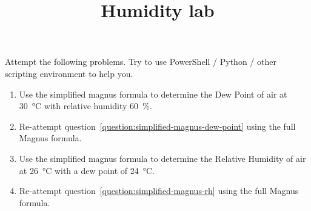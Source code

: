 \documentclass{pgnotes}
\title{Humidity lab}
\begin{document}
\maketitle

Attempt the following problems.
Try to use PowerShell / Python / other scripting environment to help you. 

\begin{enumerate}

  
\item
  \label{question:simplified-magnus-dew-point}
  Use the simplified magnus formula to determine the Dew Point of air at \SI{30}{\celsius} with relative humidity \SI{60}{\percent}.

\item
  Re-attempt question~\ref{question:simplified-magnus-dew-point} using the full Magnus formula.
  
\item
  \label{question:simplified-magnus-rh}  
  Use the simplified magnus formula to determine the Relative Humidity of air at \SI{26}{\celsius} with a dew point of \SI{24}{\celsius}. 

\item
  Re-attempt question~\ref{question:simplified-magnus-rh} using the full Magnus formula.

  
\end{enumerate}
\end{document}
